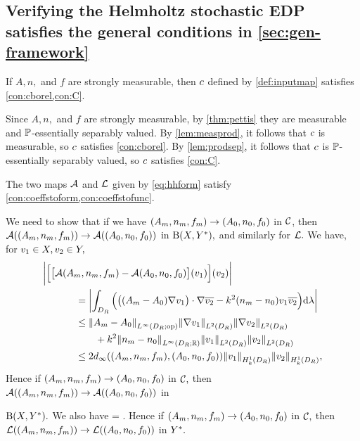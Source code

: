 \subsection{Verifying the Helmholtz stochastic EDP satisfies the general conditions in \cref{sec:gen-framework}}\label{sec:hh-cond}

\label{lem:hh-borelC}
If $A,n,$ and $f$ are strongly measurable, then $c$ defined by  \cref{def:inputmap} satisfies \cref{con:cborel,con:C}.
\ele

\bpf
Since $A,n,$ and $f$ are strongly measurable, by \cref{thm:pettis} they are measurable and $\mathbb P$-essentially separably valued. By \cref{lem:measprod}, it follows that $c$ is measurable, so $c$ satisfies \cref{con:cborel}. By \cref{lem:prodsep}, it follows that $c$ is $\mathbb P$-essentially separably valued, so $c$ satisfies \cref{con:C}.
\epf

\label{lem:hh-AL}
The two maps $\mathcal A$ and $\mathcal L$ given by \eqref{eq:hhform} satisfy \cref{con:coeffstoform,con:coeffstofunc}.
\ele

We need to show that if we have $(A_{m},n_{m},f_{m}) \rightarrow (A_{0},n_{0},f_{0})$ in $\mathcal C$, then $\mathcal A((A_{m},n_{m},f_{m})) \rightarrow \mathcal A((A_{0},n_{0},f_{0}))$ in $\homspace,$ and similarly for $\mathcal L.$ We have, for $v_{1} \in X,v_{2} \in Y,$
\begin{align*}
&\biggabs{\Big[\big[\toform\mleft(\Am,\nm,\fm\mright) - \toform\mleft(\Az,\nz,\fz\mright)\big]\mleft(\vo\mright)\Big]\mleft(\vt\mright)}\\
&\quad\quad\quad\,\,= \abs{\int_{\DR} \Big(\big(\mleft(\Am-\Az\mright)\grad \vo\big)\cdot\grad\vtb- k^2 \mleft(\nm-\nz\mright) \vo\vtb\Big)\dd\Leb}\\
&\quad\quad\quad\,\,\leq\NLiDRRRdtd{\Am-\Az}\NLtDR{\grad \vo}\NLtDR{\grad \vt} 
\\
&\quad\quad\quad\,\,\quad\quad
+k^2\NLiDRRR{\nm-\nz}\NLtDR{\vo}\NLtDR{\vt}\\
&\quad\quad\quad\,\,\leq 2\dinfty((\Am,\nm,\fm),(\Az,\nz,\fz))\NHokDR{\vo}\NHokDR{\vt},
\end{align*}
Hence if $(A_{m},n_{m},f_{m}) \rightarrow (A_{0},n_{0},f_{0})$ in $\mathcal C,$ then $\mathcal A((A_{m},n_{m},f_{m})) \rightarrow \mathcal A((A_{0},n_{0},f_{0}))$ in 

\noindent $\homspace.$ We also have
\beqs
\Bigabs{\big[\rhs\mleft(\mleft(\Am,\nm,\fm\mright),\mright) - \rhs\mleft(\mleft(\Az,\nz,\fz\mright)\mright)\big]\mleft(\vt\mright)} 
 = \abs{\int_{\DR} \mleft(\fm- \fz\mright)\vtb\,\dd\Leb}
 \leq \NLtDR{\fm-\fz} .
\eeqs
Hence if $(A_{m},n_{m},f_{m}) \rightarrow (A_{0},n_{0},f_{0})$ in $\mathcal C,$ then $\mathcal L((A_{m},n_{m},f_{m})) \rightarrow \mathcal L((A_{0},n_{0},f_{0}))$ in $Y^{*}.$
\epf

